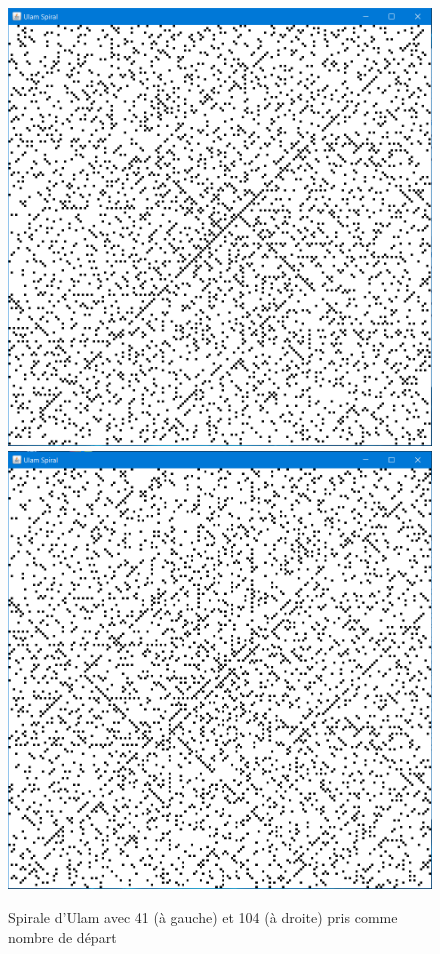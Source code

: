 \begin{figure}[H]
\begin{center}
\includegraphics[scale=0.3]{images/spirale_41.PNG}
\includegraphics[scale=0.3]{images/spirale_104.PNG}
\end{center}
\caption{Spirale d'Ulam avec 41 (à gauche) et 104 (à droite) pris comme nombre de départ}
\end{figure}

